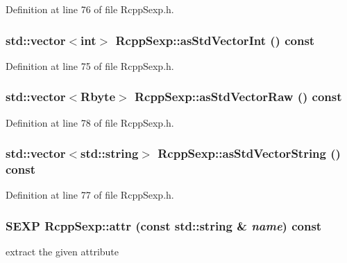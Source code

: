 Definition at line 76 of file RcppSexp.h.\hypertarget{classRcppSexp_a52e3a6412053e02416a62d15525b69ae}{
\subsubsection[{asStdVectorInt}]{\setlength{\rightskip}{0pt plus 5cm}std::vector$<$int$>$ RcppSexp::asStdVectorInt () const}}
\label{classRcppSexp_a52e3a6412053e02416a62d15525b69ae}


Definition at line 75 of file RcppSexp.h.\hypertarget{classRcppSexp_a36d997dd386ef298196752f61cd51358}{
\subsubsection[{asStdVectorRaw}]{\setlength{\rightskip}{0pt plus 5cm}std::vector$<$Rbyte$>$ RcppSexp::asStdVectorRaw () const}}
\label{classRcppSexp_a36d997dd386ef298196752f61cd51358}


Definition at line 78 of file RcppSexp.h.\hypertarget{classRcppSexp_a7ae15462b92d708a80711bc597d72255}{
\subsubsection[{asStdVectorString}]{\setlength{\rightskip}{0pt plus 5cm}std::vector$<$std::string$>$ RcppSexp::asStdVectorString () const}}
\label{classRcppSexp_a7ae15462b92d708a80711bc597d72255}


Definition at line 77 of file RcppSexp.h.\hypertarget{classRcppSexp_a307406502d249d2fd8ad41d155c87302}{
\subsubsection[{attr}]{\setlength{\rightskip}{0pt plus 5cm}SEXP RcppSexp::attr (const std::string \& {\em name}) const}}
\label{classRcppSexp_a307406502d249d2fd8ad41d155c87302}
extract the given attribute 


